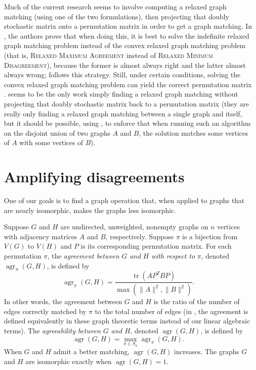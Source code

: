 \documentclass{article}
\newcommand{\1}{\mathbf{1}}
\newcommand{\RMD}{\textsc{Relaxed Minimum Disagreement}}
\newcommand{\RMA}{\textsc{Relaxed Maximum Agreement}}
\DeclareMathOperator{\tr}{tr}
\DeclareMathOperator{\agr}{agr}
\begin{document}
Much of the current research seems to involve computing a relaxed graph matching (using one of the two formulations), then projecting that doubly stochastic matrix onto a permutation matrix in order to get a graph matching.
In \autocite{l14}, the authors prove that when doing this, it is best to solve the indefinite relaxed graph matching problem instead of the convex relaxed graph matching problem (that is, \RMA{} instead of \RMD{}), because the former is almost always right and the latter almost always wrong; \autocite{v14} follows this strategy.
Still, under certain conditions, solving the convex relaxed graph matching problem can yield the correct permutation matrix \autocite{abk14, fs14}.
\autocite{kmgg14} seems to be the only work simply finding a relaxed graph matching without projecting that doubly stochastic matrix back to a permutation matrix (they are really only finding a relaxed graph matching between a single graph and itself, but it should be possible, using \autocite{gkms14}, to enforce that when running such an algorithm on the disjoint union of two graphs $A$ and $B$, the solution matches some vertices of $A$ with some vertices of $B$).

\section{Amplifying disagreements}

One of our goals is to find a graph operation that, when applied to graphs that are nearly isomorphic, makes the graphs less isomorphic.

Suppose $G$ and $H$ are undirected, unweighted, nonempty graphs on $n$ vertices with adjacency matrices $A$ and $B$, respectively.
Suppose $\pi$ is a bijection from $V(G)$ to $V(H)$ and $P$ is its corresponding permutation matrix.
For each permutation $\pi$, the \emph{agreement between $G$ and $H$ with respect to $\pi$}, denoted $\agr_\pi(G, H)$, is defined by
\begin{equation*}
  \agr_\pi(G, H) = \frac{\tr(AP^TBP)}{\max(\|A\|^2, \|B\|^2)}.
\end{equation*}
In other words, the agreement between $G$ and $H$ is the ratio of the number of edges correctly matched by $\pi$ to the total number of edges (in \autocite{owwz14}, the agreement is defined equivalently in these graph theoretic terms instead of our linear algebraic terms).
The \emph{agreeability between $G$ and $H$}, denoted $\agr(G, H)$, is defined by
\begin{equation*}
  \agr(G, H) = \max_{\pi \in S_n} \agr_\pi(G, H).
\end{equation*}
When $G$ and $H$ admit a better matching, $\agr(G, H)$ increases.
The graphs $G$ and $H$ are isomorphic exactly when $\agr(G, H) = 1$.
\end{document}
